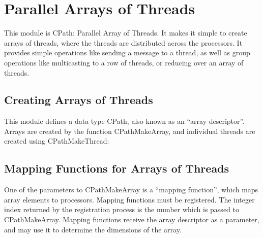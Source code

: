 \chapter{Parallel Arrays of Threads}

This module is CPath: \converse{} Parallel Array of Threads.  It makes it
simple to create arrays of threads, where the threads are distributed
across the processors.  It provides simple operations like sending a
message to a thread, as well as group operations like multicasting to
a row of threads, or reducing over an array of threads.

\section{Creating Arrays of Threads}

This module defines a data type CPath, also known as an ``array
descriptor''.  Arrays are created by the function CPathMakeArray,
and individual threads are created using CPathMakeThread:



\section{Mapping Functions for Arrays of Threads}

One of the parameters to CPathMakeArray is a ``mapping function'',
which maps array elements to processors.  Mapping functions must be
registered.  The integer index returned by the registration process is
the number which is passed to CPathMakeArray.  Mapping functions
receive the array descriptor as a parameter, and may use it to determine
the dimensions of the array.


